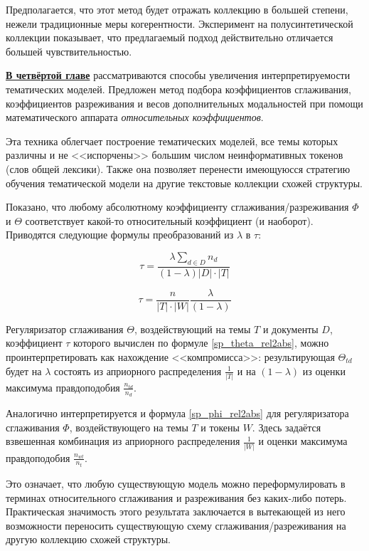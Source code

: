 Предполагается, что этот метод будет отражать коллекцию в большей степени, нежели традиционные меры когерентности. Эксперимент на полусинтетической коллекции показывает, что предлагаемый подход действительно отличается большей чувствительностью.

\underline{\textbf{В четвёртой главе}} рассматриваются способы увеличения интерпретируемости тематических моделей. Предложен метод подбора коэффициентов сглаживания, коэффициентов разреживания и весов дополнительных модальностей при помощи математического аппарата \textit{относительных коэффициентов}.

Эта техника облегчает построение тематических моделей, все темы которых различны и не <<испорчены>> большим числом неинформативных токенов (слов общей лексики). Также она позволяет перенести имеющуюсся стратегию обучения тематической модели на
другие текстовые коллекции схожей структуры.

Показано, что любому абсолютному коэффициенту сглаживания/разреживания $\Phi$ и $\Theta$ соответствует какой-то относительный коэффициент (и наоборот). Приводятся следующие формулы преобразований из $\lambda$ в $\tau$:

\begin{equation}
\tau = \frac{\lambda \sum_{d\in D} n_d }{(1-\lambda) |D| \cdot |T|} \label{sp_theta_rel2abs}
\end{equation}

\begin{equation}
\tau = \frac{n}{|T|\cdot|W|} \frac{\lambda}{(1-\lambda)}  \label{sp_phi_rel2abs}
\end{equation}

Регуляризатор сглаживания $\Theta$, воздействующий на темы $T$ и документы $D$, коэффициент $\tau$ которого вычислен по формуле \ref{sp_theta_rel2abs}, можно проинтерпретировать как нахождение <<компромисса>>: результирующая $\Theta_{td}$ будет на $\lambda$ состоять из априорного распределения $\frac{1}{|T|}$ и на $(1-\lambda)$ из оценки максимума правдоподобия $\frac{n_{td}}{n_d}$.

Аналогично интерпретируется и формула \ref{sp_phi_rel2abs} для регуляризатора сглаживания $\Phi$, воздействующего на темы $T$ и токены $W$. Здесь задаётся взвешенная комбинация из априорного распределения $\frac{1}{|W|}$ и оценки максимума правдоподобия $\frac{n_{wt}}{n_t}$.

Это означает, что любую существующую модель можно переформулировать в терминах относительного сглаживания и разреживания без каких-либо потерь. Практическая значимость этого результата заключается в вытекающей из него возможности переносить существующую схему сглаживания/разреживания на другую коллекцию схожей структуры.

